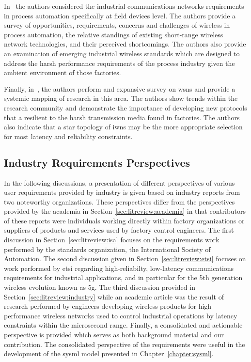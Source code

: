 In~\cite{Ikram2010} the authors considered the industrial communications networks requirements in process automation specifically at field devices level. The authors provide a survey of opportunities, requirements, concerns and challenges of wireless in process automation, the relative standings of existing short-range wireless network technologies, and their perceived shortcomings. The authors also provide an examination of emerging industrial wireless standards which are designed to address the harsh performance requirements of the process industry given the ambient environment of those factories.

Finally, in~\cite{QUEIROZ201796}, the authors perform and expansive survey on \glspl{wsn} and provide a systemic mapping of research in this area.  The authors show trends within the research community and demonstrate the importance of developing new protocols that a resilient to the harsh transmission media found in factories.  The authors also indicate that a star topology of \glspl{iwn} may be the more appropriate selection for most latency and reliability constraints.


\subsection{Industry Requirements Perspectives}

In the following discussions, a presentation of different perspectives of various user requirements provided by industry is given based on industry reports from two noteworthy organizations.  These perspectives differ from the perspectives provided by the academia in Section~\ref{sec:litreview:academia} in that contributors of these reports were individuals working directly within factory organizations or suppliers of products and services used by factory control engineers.  The first discussion in Section~\ref{sec:litreview:isa} focuses on the requirements work performed by the standards organization, the International Society of Automation.  The second discussion given in Section~\ref{sec:litreview:etsi} focuses on work performed by \gls{etsi} regarding high-reliabilty, low-latency communications requirements for industrial applications, and in particular for the 5th generation wireless evolution known as \gls{5g}.  The third discussion provided in Section~\ref{sec:litreview:industry} while an academic article was the result of research performed by engineers developing wireless products for high-performance wireless networks used to control industrial operations by latency constraints within the microsecond range.  Finally, a consolidated and actionable perspective is provided which serves as both background material and our contribution.  The consolidated perspective of the requirements were useful in the development of the \gls{sysml} model presented in Chapter~\ref{chapter:sysml}.

